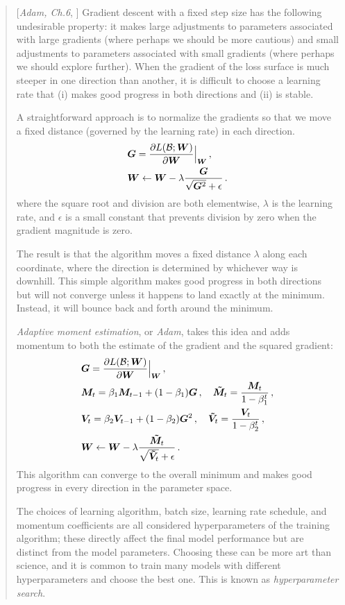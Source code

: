 \documentclass{myclass}
\numberwithin{equation}{subsection}
\begin{document}
\begin{quote}[\textit{Adam, Ch.6}, \cite{prince2023understanding}]
Gradient descent with a fixed step size has the following undesirable property: it makes large
adjustments to parameters associated with large gradients (where perhaps we should be more cautious)
and small adjustments to parameters associated with small gradients (where perhaps we should explore
further). When the gradient of the loss surface is much steeper in one direction than another, it is
difficult to choose a learning rate that (i) makes good progress in both directions and (ii) is
stable.

A straightforward approach is to normalize the gradients so that we move a fixed distance (governed
by the learning rate) in each direction.
\[
\begin{split}
&\bm{G} = \pdv{L(\mathcal{B}; \bm{W})}{\bm{W}}\Big|_{\bm{W}}\,,\\
&\bm{W} \gets \bm{W} - \lambda \frac{\bm{G}}{\sqrt{\bm{G}^2} + \epsilon}\,.
\end{split}
\]
where the square root and division are both elementwise, \(\lambda\) is the learning rate, and
\(\epsilon\) is a small constant that prevents division by zero when the gradient magnitude is zero.

The result is that the algorithm moves a fixed distance \(\lambda\) along each coordinate, where the
direction is determined by whichever way is downhill. This simple algorithm makes good progress in
both directions but will not converge unless it happens to land exactly at the minimum. Instead, it
will bounce back and forth around the minimum.

\textit{Adaptive moment estimation}, or \textit{Adam}, takes this idea and adds momentum to both the
estimate of the gradient and the squared gradient:
\[
\begin{split}
&\bm{G} = \pdv{L(\mathcal{B}; \bm{W})}{\bm{W}}\Big|_{\bm{W}}\,,\\
&\bm{M}_t = \beta_1 \bm{M}_{t-1} + (1 - \beta_1) \bm{G}  \,,\quad \bm{\tilde M}_t = \frac{\bm{M}_t}{1 - \beta_1^t}\,,\\
&\bm{V}_t = \beta_2 \bm{V}_{t-1} + (1 - \beta_2) \bm{G}^2\,,\quad \bm{\tilde V}_t = \frac{\bm{V}_t}{1 - \beta_2^t}\,,\\
&\bm{W} \gets \bm{W} - \lambda \frac{\bm{\tilde M}_t}{\sqrt{\bm{\tilde V}_t} + \epsilon}\,.
\end{split}
\]
This algorithm can converge to the overall minimum and makes good progress in every direction in the
parameter space.

The choices of learning algorithm, batch size, learning rate schedule, and momentum coefficients are
all considered hyperparameters of the training algorithm; these directly affect the final model
performance but are distinct from the model parameters. Choosing these can be more art than science,
and it is common to train many models with different hyperparameters and choose the best one. This
is known as \textit{hyperparameter search}.
\end{quote}
\end{document}
